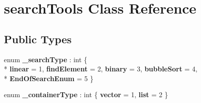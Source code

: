 \hypertarget{classsearch_tools}{}\section{search\+Tools Class Reference}
\label{classsearch_tools}
\subsection*{Public Types}
\begin{DoxyCompactItemize}
\item 
\hypertarget{classsearch_tools_abfbf89b8633afad7c82b8895465127e4}{}enum {\bfseries \+\_\+search\+Type} \+: int \{ \\*
{\bfseries linear} = 1, 
{\bfseries find\+Element} = 2, 
{\bfseries binary} = 3, 
{\bfseries bubble\+Sort} = 4, 
\\*
{\bfseries End\+Of\+Search\+Enum} = 5
 \}\label{classsearch_tools_abfbf89b8633afad7c82b8895465127e4}

\item 
\hypertarget{classsearch_tools_a2a594da1ab2a79fe04d7d53fc52d5bfd}{}enum {\bfseries \+\_\+container\+Type} \+: int \{ {\bfseries vector} = 1, 
{\bfseries list} = 2
 \}\label{classsearch_tools_a2a594da1ab2a79fe04d7d53fc52d5bfd}

\end{DoxyCompactItemize}
